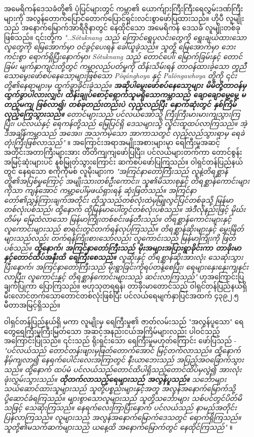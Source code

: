\documentclass[10pt,twocolumn,letterpaper]{article}
\begin{document}
အမေရိကန်ဒေသခံတို့၏ ပုံပြင်များတွင် ကမ္ဘာ၏ ယောက်ျားကြီးကြီးရေလွှမ်းဒဏ်ကြီးများကို အလွန်တောက်ပြောင်တောက်ပြောင်ရှင်းလင်းစွာဖော်ပြထားသည်။ ဟိုပီ လူမျိုးသည် အနောက်မြောက်အာရီဇိုနာတွင် နေထိုင်သော အမေရိကန် ဒေသခံ လူမျိုးတစ်ခုဖြစ်သည်။ ၎င်းတို့က \textit{"..Sótuknang သည် ကြောင်ရွေပုလင်းတွေကို ရွေးချယ်ထားသော လူတွေကို မြေအောက်မှာ ဝင်ခွင့်ပေးရန် ခေါ်ယူခဲ့သည်။ သူတို့ မြေအောက်မှာ ဘေးကင်းစွာ ရောက်ရှိပြီးနောက်မှာ၊ Sótuknang သည် တောင်ပေါ်၊ မြောက်ခြမ်းနှင့် တောင်ခြမ်း မျက်နှာကျင်းတို့တွင် ကမ္ဘာလည်ပတ်မှုကို ထိန်းသိမ်းရန် တာဝန်ထားခဲ့သော တူညီသောမွေးဖော်စပ်နေသော့များဖြစ်သော Pöqánghoya နှင့် Palöngawhoya တို့ကို ၎င်းတို့၏နေရာများမှ ထွက်ခွာခိုင်းခဲ့သည်။ \textbf{အဆိုပါမွေးဖော်စပ်နေသော့များ မိမိတို့တာဝန်မှထွက်ခွာပါလားလျှင်၊ ထိန်းချုပ်စောင့်ရှောက်သူမရှိသောကမ္ဘာသည် ချောချောမွေ့မွေ့ မတည့်မကျ ဖြစ်လာ၍၊ တစ်ခုတည်းတည်းပဲ လှည့်လည်ပြီး နောက်ဆုံးတွင် နှစ်ကြိမ်လှည့်ကြွေသွားသည်။} တောင်များသည် ပင်လယ်အော်သို့ ကြီးကြီးမားမားကျသွားကြပြီး၊ ပင်လယ်နှင့် ရေကန်တို့သည် မြေပြင်ရှိ ဒေသများသို့ လှိုင်းထူထပ်လာကြသည်။ အဲ့ဒီအချိန်ကမ္ဘာသည် အအေး၊ အသက်မဲ့သော အာကာသတွင် လှည့်လည်သွားရာမှ ရေခဲတုံးကြီးဖြစ်လာသည်"} \cite{4}။
အကြောင်းအရာအမျိုးအစားများမှာ ရေကြီးမှုအဆင့်အတိုင်းအတာကြီးများအား တိတိကျကျဖော်ပြပြီး၊ ပင်လယ်များတက်ကာ တောင်စွန်းအမြင့်ဆုံးများပင် နစ်မြုတ်သွားကြောင်း ဆက်စပ်ဖော်ပြကြသည်။ ဝါရှင်တန်ပြည်နယ်တွင် နေရသော စကိုကိုမစ် လူမ်ိုးများက \textit{"အကြင်နာတော်ကြီးသည် လူနဲ့တိရစ္ဆာန်တို့၏အပြစ်မှုကြောင့် အမျိုးသားတစ်ဦးကောင်း၊ သူ၏မိသားစုနှင့် တိရစ္ဆာန်ကောင်းများကိုသာ ကျန်အောင် ကမ္ဘာ့ပေါ်မှဖယ်ရှားရန် ဆုံးဖြတ်သည်။ အကြင်နာတော်၏ညွှန်ကြားချက်အတိုင်း ထိုသူသည်တစ်လုံးထဲမှမြူလွင်ပြင်တစ်ခုသို့ မြန်မာတစ်လုံးပစ်သည်၊ ထို့နောက် ထိုမြန်မာပေါ်တွင်တစ်လုံးပစ်သည်။ အဲဒီလိုနည်းဖြင့် မိုဃ်းတိမ်မှ မြေထံလာသော မြန်မာကြိုးတစ်စင်းဖန်တီးသည်။ တိရစ္ဆာန်ကောင်းများနှင့် လူကောင်းများသည် စာရင်းတွင်တက်ရန်လုပ်ကြသည်။ တိရစ္ဆာန်ဆိုးများနှင့် မွှေးမြိတ်များသည်လည်း တက်ရန်ကြိုးစားသော်လည်း လူကောင်းသည် မြန်မာကြိုးကို ဖြတ်ပစ်သည်။ \textbf{ထို့နောက်၊ အကြင်နာတော်ကြီးသည် မိုးအများအပြားရွာခိုင်းကာ တာခိုးမာနှင့်တောင်ထိပ်အနီးထိ ရေကြီးစေသည်။} လူဆိုးနှင့် တိရစ္ဆာန်ဆိုးအားလုံး သေဆုံးသွားပြီးနောက်၊ အကြင်နာတော်ကြီးသည် မိုးရွာခြင်းကိုရပ်တန့်စေပြီး၊ ရေများနှေးနှေးကျနင်းလာပြီး၊ လူကောင်းနှင့် တိရစ္ဆာန်ကောင်းများသည် ဆင်းလာကြသည်"} \cite{3} ဟုအကြောင်းပြချက်ပြုကာ ပြောကြသည်။ ဗဟုသုတရရန်၊ တာခိုးမာတောင်သည် ဝါရှင်တန်ပြည်နယ်ရှိ မီးလောင်တက်သောတောင်တစ်လုံးဖြစ်ပြီး ပင်လယ်ရေမျက်နှာပြင်အထက် ၄၃၉၂.၅ မီတာအမြင့်ရှိသည်။

ဝါရှင်တန်ပြည်နယ်ရှိ မကာ လူမျိုးမှ ရေကြီးမှု၏ ဇာတ်လမ်းသည် "အလွန်ပူသော" ရေတွေရေကြီးမှုကြီးမြတ်သော အဆင့်အနည်းငယ်အကြိမ်များလည်း ပါဝင်သည့်အကြောင်းပြုသည်။ ၎င်းသည် ရိုးရှင်းသော ရေကြီးမှုမဟုတ်ကြောင်း ဖော်ပြသည် - \textit{"ပင်လယ်သည် တောင်တန်းဖျားမှဖြတ်တောက်အောင် မြင့်တက်လာသည်။ ထို့နောက် နိမ့်ကျလာ၍ နေရက်ပေါင်းလေးအကြာတွင် နီးယာဘေးသည် အပြည့်အဝခြောက်သွားသည်။ ထို့နောက် ထပ်မံ ပင်လယ်သည်တောင်ထိပါရှိသည့်တောင်ထိပ်မှလွဲ၍ အားလုံးဖုံးလွှမ်းသွားသည်။ \textbf{ထိုတက်လာသည့်ရေများသည် အလွန်ပူသည်။} သင်္ဘောများသယ်ဆောင်ထားသူများသည် သူတို့ပစ္စည်းများနှင့်အတူ အလွန်အနောက်မြောက်သို့ ပို့ဆောင်ခံရကြသည်။ များစွာသောလူများသည် သူတို့သင်္ဘောများ သစ်ပင်တွင်ပိတ်မိသဖြင့် သေဆုံးကြသည်။ နေရက်လေးကြာပြီးနောက် ပင်လယ်သည် နာမည်အတိုင်းပြန်လာကြသည်။ လူများသည် အလွန်အနောက်မြောက်ဒေသတွင် ရောက်ရှိကြသည်။ သူတို့၏မသက်ဆက်များသည် ယနေ့ထိ အနောက်မြောက်တွင် နေထိုင်ကြသည်"} \cite{3}။
\end{document}
